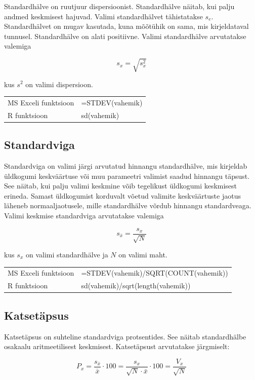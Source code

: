\documentclass[
]{book}
\begin{document}
Standardhälve on ruutjuur dispersioonist. Standardhälve näitab, kui palju andmed keskmisest hajuvad. Valimi standardhälvet tähistatakse \(s_e\). Standardhälvet on mugav kasutada, kuna mõõtühik on sama, mis kirjeldataval tunnusel. Standardhälve on alati positiivne. Valimi standardhälve arvutatakse valemiga

\[s_x = \sqrt{s_x^2}\]

kus \(s^2\) on valimi dispersioon.

\begin{tabular}{ll}
MS Exceli funktsioon & =STDEV(vahemik)\\
R funktsioon & sd(vahemik) \\
\end{tabular}

\subsection{Standardviga}\label{standardviga}

Standardviga on valimi järgi arvutatud hinnangu standardhälve, mis kirjeldab üldkogumi keskväärtuse või muu parameetri valimist saadud hinnangu täpsust. See näitab, kui palju valimi keskmine võib tegelikust üldkogumi keskmisest erineda. Samast üldkogumist korduvalt võetud valimite keskväärtuste jaotus läheneb normaaljaotusele, mille standardhälve võrdub hinnangu standardveaga. Valimi keskmise standardviga arvutatakse valemiga

\[
s_{\bar{x}} = \frac{s_x}{\sqrt{N}}
\]

kus \(s_x\) on valimi standardhälve ja \(N\) on valimi maht.

\begin{tabular}{ll}
MS Exceli funktsioon & =STDEV(vahemik)/SQRT(COUNT(vahemik))\\
R funktsioon & sd(vahemik)/sqrt(length(vahemik)) \\
\end{tabular}

\subsection{Katsetäpsus}\label{katsetuxe4psus}

Katsetäpsus on suhteline standardviga protsentides. See näitab standardhälbe osakaalu aritmeetilisest keskmisest. Katsetäpsust arvutatakse järgmiselt:

\[
P_x 
= \frac{s_{\bar{x}}}{\bar{x}} \cdot 100 
= \frac{s_x}{\sqrt{N} \cdot \bar{x}} \cdot 100 
= \frac{V_x}{\sqrt{N}}
\]
\end{document}
